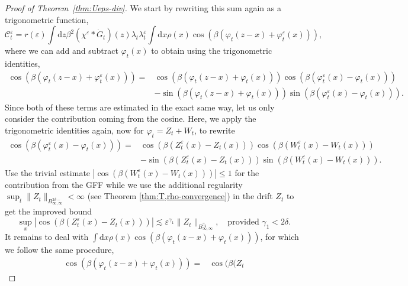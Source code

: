 \documentclass[11pt, a4paper]{scrartcl}
\numberwithin{equation}{section}
\theoremstyle{plain}
\theoremstyle{remark}
\newcommand{\mathd}{\mathrm{d}}
\newcommand{\tmtextbf}[1]{\text{{\bfseries{#1}}}}
\begin{document}
\begin{proof}[Proof of Theorem~\ref{thm:Ueps-div}]
	\tmtextbf{($\mathcal{C}^{\varepsilon}_t$).} We start by rewriting this sum
	again as a trigonometric function,
	\[ \mathcal{C}^{\varepsilon}_t = r (\varepsilon) \int \mathd z \beta^2
		(\chi^{\varepsilon} \ast \dot{G}_t ) (z) \lambda_t
		\lambda_t^{\varepsilon} \int \mathd x \rho (x) \cos (\beta (\varphi_t (z
				- x) + \varphi_t^{\varepsilon} (x))), \]
	where we can add and subtract $\varphi_t (x)$ to obtain using the
	trigonometric identities,
	\[ \begin{aligned}
			\cos (\beta (\varphi_t (z - x) + \varphi_t^{\varepsilon} (x))) = &
			\cos (\beta (\varphi_t (z - x) + \varphi_t (x))) \cos (\beta
			(\varphi_t^{\varepsilon} (x) - \varphi_t (x)))                                                                                    \\
			                                                                 & - \sin (\beta (\varphi_t (z - x) + \varphi_t (x))) \sin (\beta
				(\varphi_t^{\varepsilon} (x) - \varphi_t (x))) .
		\end{aligned} \]
	Since both of these terms are estimated in the exact same way, let us only
	consider the contribution coming from the cosine. Here, we apply the
	trigonometric identities again, now for $\varphi_t = Z_t + W_t$, to rewrite
	\[ \begin{aligned}
			\cos (\beta (\varphi_t^{\varepsilon} (x) - \varphi_t (x))) = & \cos
			(\beta (Z_t^{\varepsilon} (x) - Z_t (x))) \cos (\beta
			(W_t^{\varepsilon} (x) - W_t (x)))                                                                                          \\
			                                                             & - \sin (\beta (Z_t^{\varepsilon} (x) - Z_t (x))) \sin (\beta
			(W_t^{\varepsilon} (x) - W_t (x))) .
		\end{aligned} \]
	Use the trivial estimate $| \cos (\beta (W_t^{\varepsilon} (x) - W_t (x))) |
		\leqslant 1$ for the contribution from the GFF while we use the additional
	regularity $\sup_t \| Z_t \|_{B_{\infty, \infty}^{2 \delta -}} < \infty$
	(see Theorem \ref{thm:T,rho-convergence}) in the drift $Z_t$ to get the
	improved bound
	\[ \sup_x  | \cos (\beta (Z_t^{\varepsilon} (x) - Z_t (x))) | \lesssim
		\varepsilon^{\gamma_1} \| Z_t \|_{B^{\gamma_2}_{\infty, \infty}}, \quad
		\text{provided } \gamma_1 < 2 \delta . \]
	It remains to deal with $\int \mathd x \rho (x) \cos (\beta (\varphi_t (z -
				x) + \varphi_t (x)))$, for which we follow the same procedure,
	\[ \begin{aligned}
			\cos (\beta (\varphi_t (z - x) + \varphi_t (x))) = & \cos (\beta (Z_t

\end{aligned}\]
\end{proof}
\end{document}
